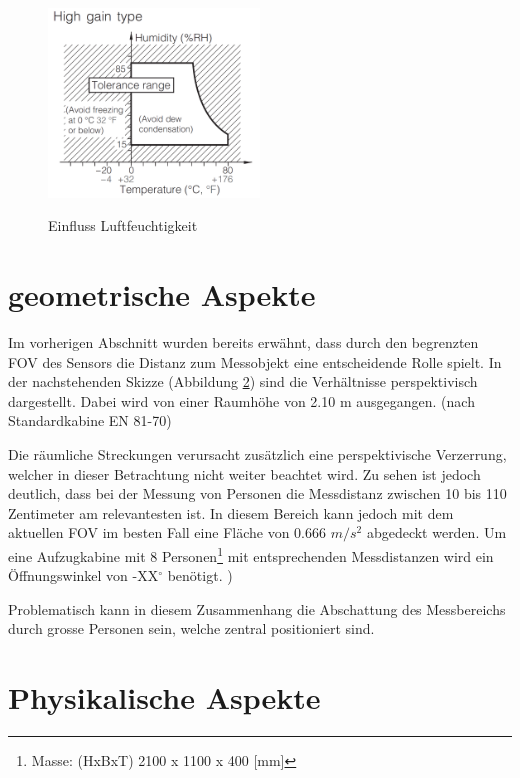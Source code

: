\begin{figure}[H]
	\centering
	\includegraphics[width=0.5\textwidth]
	{fig/Humidity_Tolerance.PNG}
	\caption[Einfluss Luftfeuchtigkeit]{Einfluss Luftfeuchtigkeit} \protect\cite{AMG8834}
	\label{fig:Humidity}
\end{figure}


\section{geometrische Aspekte}

Im vorherigen Abschnitt wurden bereits erwähnt, dass durch den begrenzten \ac{FOV} des Sensors die Distanz zum Messobjekt eine entscheidende Rolle spielt. In der nachstehenden Skizze (Abbildung \ref{}) sind die Verhältnisse perspektivisch dargestellt. Dabei wird von einer Raumhöhe  von 2.10 m ausgegangen. (nach Standardkabine EN 81-70)   

Die räumliche Streckungen verursacht zusätzlich eine perspektivische Verzerrung, welcher in dieser Betrachtung nicht weiter beachtet wird. Zu sehen ist jedoch deutlich, dass bei der Messung von Personen die Messdistanz zwischen 10 bis 110 Zentimeter am relevantesten ist. In diesem Bereich kann jedoch mit dem aktuellen \ac{FOV} im besten Fall eine Fläche von 0.666 $ m/s^2 $ abgedeckt werden. Um eine Aufzugkabine mit 8 Personen\footnote[1]{Masse: (HxBxT) 2100 x 1100 x 400 [mm]} mit entsprechenden Messdistanzen wird ein Öffnungswinkel von -XX$^\circ$ benötigt. 
)

Problematisch kann in diesem Zusammenhang die Abschattung des Messbereichs durch grosse Personen sein, welche zentral positioniert sind.

  


\section{Physikalische Aspekte}

